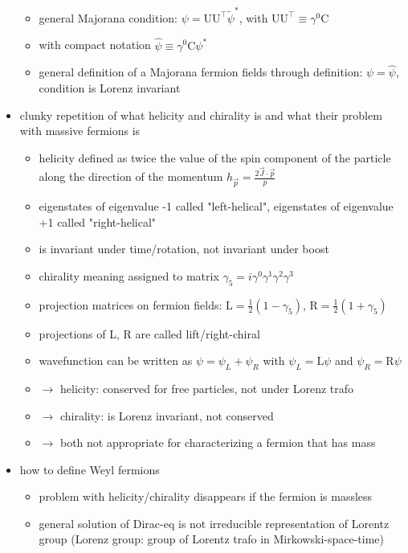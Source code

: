\begin{itemize}
\begin{itemize}
\item general Majorana condition: \(\psi = \mathrm{U}\mathrm{U}^\top\tilde{\psi}^*\), with \(\mathrm{U}\mathrm{U}^\top \equiv \gamma^0 \mathrm{C}\)
\item with compact notation \(\widehat{\psi} \equiv \gamma^0 \mathrm{C} \psi^*\)
\item general definition of a Majorana fermion fields through definition: \(\psi = \widehat{\psi}\), condition is Lorenz invariant
\end{itemize}
\item clunky repetition of what helicity and chirality is and what their problem with massive fermions is
\begin{itemize}
\item helicity defined as twice the value of the spin component of the particle along the direction of the momentum \(h_{\vec{p}} = \frac{2 \vec{J} \cdot \vec{p}}{p}\)
\item eigenstates of eigenvalue -1 called "left-helical", eigenstates of eigenvalue +1 called "right-helical"
\item is invariant under time/rotation, not invariant under boost
\item chirality meaning assigned to matrix \(\gamma_5 = i\gamma^0\gamma^1\gamma^2\gamma^3\)
\item projection matrices on fermion fields: \( \mathrm{L} = \frac{1}{2} \left( 1- \gamma_5\right ) \), \( \mathrm{R} = \frac{1}{2} \left( 1 + \gamma_5\right ) \)
\item projections of L, R are called lift/right-chiral
\item wavefunction can be written as \(\psi = \psi_L + \psi_R\) with \(\psi_L = \mathrm{L}\psi\) and \(\psi_R = \mathrm{R}\psi\)
\item \(\rightarrow\) helicity: conserved for free particles, not under Lorenz trafo
\item \(\rightarrow\) chirality: is Lorenz invariant, not conserved
\item \(\rightarrow\) both not appropriate for characterizing a fermion that has mass
\end{itemize}
\item how to define Weyl fermions
\begin{itemize}
\item problem with helicity/chirality disappears if the fermion is massless
\item general solution of Dirac-eq is not irreducible representation of Lorentz group (Lorenz group: group of Lorentz trafo in Mirkowski-space-time)

\end{itemize}
\end{itemize}
